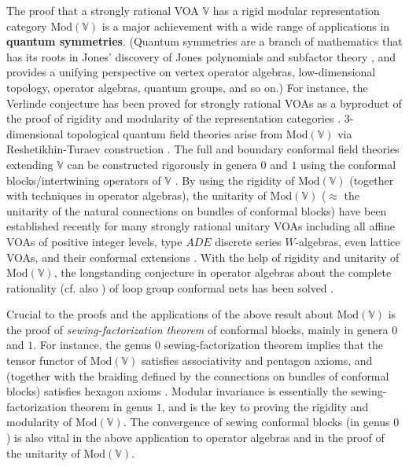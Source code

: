 \documentclass[11pt,b5paper,notitlepage]{article}
\theoremstyle{definition}
\theoremstyle{plain}
\newcommand{\Vbb}{\mathbb V}
\newcommand{\<}{\left\langle}
\renewcommand{\>}{\right\rangle}
\newcommand{\Mod}{\mathrm{Mod}}
\numberwithin{equation}{subsection}
\begin{document}
The proof that a strongly rational VOA $\Vbb$ has a rigid modular representation category $\Mod(\Vbb)$ is a major achievement with a wide range of applications in \textbf{quantum symmetries}. (Quantum symmetries are a branch of mathematics that has its roots in Jones' discovery of Jones polynomials \cite{Jones-polynomials} and subfactor theory \cite{Jones-subfactors}, and provides a unifying perspective on vertex operator algebras, low-dimensional topology, operator algebras, quantum groups, and so on.) For instance, the Verlinde conjecture has been proved for strongly rational VOAs as a byproduct of the proof of rigidity and modularity of the representation categories \cite{Hua-Verlinde}. $3$-dimensional topological quantum field theories arise from $\Mod(\Vbb)$ via Reshetikhin-Turaev construction \cite{RT-ribbon,RT-TQFT,Tur-TQFT}. The full and boundary conformal field theories extending $\Vbb$ can be constructed rigorously in genera $0$ and $1$ using the conformal blocks/intertwining operators of $\Vbb$ \cite{FRS-TFT-1,HK-open,FFRS-TFT-5,HK-full,Kong-full,FFRS-uniqueness,Kong-Cardy,HK-modular-invariance}. By using the rigidity of $\Mod(\Vbb)$ (together with techniques in operator algebras), the unitarity of $\Mod(\Vbb)$ ($\approx$ the unitarity of the natural connections on bundles of conformal blocks) have been established recently for many strongly rational unitary VOAs including all affine VOAs of positive integer levels, type $ADE$ discrete series $W$-algebras, even lattice VOAs, and their conformal extensions \cite{Gui-unitary-1,Gui-unitary-2,Gui-Q-systems,Gui-categorical,Tener-fusion,Gui-unbounded,CGGH}. With the help of rigidity and unitarity of $\Mod(\Vbb)$, the longstanding conjecture in operator algebras about the complete rationality \cite{KLM} (cf. also \cite{Xu-JW,LX-dichotomy}) of loop group conformal nets has been solved \cite{Was-fusion,Gui-categorical,Tener-fusion}.





Crucial to the proofs and the applications of the above result about $\Mod(\Vbb)$ is the proof of \emph{sewing-factorization theorem} of conformal blocks, mainly in genera $0$ and $1$. For instance, the genus $0$ sewing-factorization theorem implies that the tensor functor of $\Mod(\Vbb)$ satisfies associativity and pentagon axioms, and (together with the braiding defined by the connections on bundles of conformal blocks) satisfies hexagon axioms \cite{Hua-tensor-4,NT-P1_conformal_blocks,Hua-rigidity-modularity}. Modular invariance \cite{Zhu-modular-invariance,DLM-modular-invariance,Hua-differential-genus-1} is essentially the sewing-factorization theorem in genus $1$, and is the key to proving the rigidity and modularity of $\Mod(\Vbb)$. The convergence of sewing conformal blocks (in genus $0$) is also vital in the above application to operator algebras and in the proof of the unitarity of $\Mod(\Vbb)$.
\end{document}
